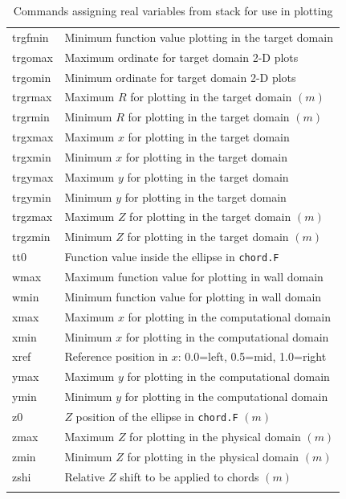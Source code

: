 \documentclass[a4paper,10pt]{report}
\begin{document}
\begin{center}
\begin{longtable}{|l|l|}
    trgfmin \index{b2plot, trgfmin} & Minimum function value plotting in the target domain \\
    trgomax \index{b2plot, trgomax} & Maximum ordinate for target domain 2-D plots \\
    trgomin \index{b2plot, trgomin} & Minimum ordinate for target domain 2-D plots \\
    trgrmax \index{b2plot, trgrmax} & Maximum $R$ for plotting in the target domain $(m)$ \\
    trgrmin \index{b2plot, trgrmin} & Minimum $R$ for plotting in the target domain $(m)$ \\
    trgxmax \index{b2plot, trgxmax} & Maximum $x$ for plotting in the target domain \\
    trgxmin \index{b2plot, trgxmin} & Minimum $x$ for plotting in the target domain \\
    trgymax \index{b2plot, trgymax} & Maximum $y$ for plotting in the target domain \\
    trgymin \index{b2plot, trgymin} & Minimum $y$ for plotting in the target domain \\
    trgzmax \index{b2plot, trgzmax} & Maximum $Z$ for plotting in the target domain $(m)$ \\
    trgzmin \index{b2plot, trgzmin} & Minimum $Z$ for plotting in the target domain $(m)$ \\
    tt0 \index{b2plot, tt0}     & Function value inside the ellipse in {\tt chord.F} \\
    wmax \index{b2plot, wmax}    & Maximum function value for plotting in wall domain \\
    wmin \index{b2plot, wmin}    & Minimum function value for plotting in wall domain \\
    xmax \index{b2plot, xmax}    & Maximum $x$ for plotting in the computational domain \\
    xmin \index{b2plot, xmin}    & Minimum $x$ for plotting in the computational domain \\
    xref \index{b2plot, xref}    & Reference position in $x$: 0.0=left, 0.5=mid, 1.0=right \\
    ymax \index{b2plot, ymax}    & Maximum $y$ for plotting in the computational domain \\
    ymin \index{b2plot, ymin}    & Minimum $y$ for plotting in the computational domain \\
    z0 \index{b2plot, z0}        & $Z$ position of the ellipse in {\tt chord.F} $(m)$ \\
    zmax \index{b2plot, zmax}    & Maximum $Z$ for plotting in the physical domain $(m)$ \\
    zmin \index{b2plot, zmin}    & Minimum $Z$ for plotting in the physical domain $(m)$ \\
    zshi \index{b2plot, zshi}    & Relative $Z$ shift to be applied to chords $(m)$ \\
    \hline
    \caption{Commands assigning real variables from stack for use in plotting}
    \label{tab:real-variables}
  \end{longtable}
\end{center}
\end{document}
